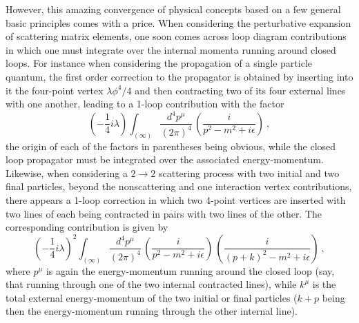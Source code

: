 \documentclass[a4paper,11pt]{article}
\begin{document}
However, this amazing convergence of physical concepts based on a few
general basic principles comes with a price. When considering the perturbative
expansion of scattering matrix elements, one soon comes across loop diagram
contributions in which one must integrate over the internal momenta running
around closed loops. For instance when considering the propagation of
a single particle quantum, the first order correction to the propagator
is obtained by inserting into it the four-point vertex $\lambda\phi^4/4$
and then contracting two of its four external lines with one another, 
leading to a 1-loop contribution with the factor
\begin{equation}
\left(-\frac{1}{4}i\lambda\right)\int_{(\infty)}\frac{d^4p^\mu}{(2\pi)^4}\,
\left(\frac{i}{p^2-m^2+i\epsilon}\right)\ ,
\end{equation}
the origin of each of the factors in parentheses being obvious, while the 
closed loop propagator must be integrated over the associated energy-momentum.
Likewise, when considering a $2\rightarrow 2$ scattering process with
two initial and two final particles, beyond the nonscattering and
one interaction vertex contributions, there appears a 1-loop correction
in which two 4-point vertices are inserted with two lines of each being
contracted in pairs with two lines of the other. The corresponding 
contribution is given by
\begin{equation}
\left(-\frac{1}{4}i\lambda\right)^2\int_{(\infty)}\frac{d^4p^\mu}{(2\pi)^4}\,
\left(\frac{i}{p^2-m^2+i\epsilon}\right)\,
\left(\frac{i}{(p+k)^2-m^2+i\epsilon}\right)\ ,
\end{equation}
where $p^\mu$ is again the energy-momentum running around the closed loop
(say, that running through one of the two internal contracted lines), while 
$k^\mu$ is the total external energy-momentum of the two initial or final 
particles ($k+p$ being then the energy-momentum running through the other 
internal line).
\end{document}
